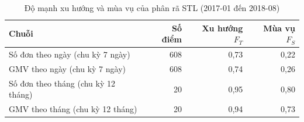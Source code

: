\begin{table}[htbp]\centering\scriptsize\caption{Độ mạnh xu hướng và mùa vụ của phân rã STL (2017-01 đến 2018-08)}\label{tab:stl}
\begin{tabular}{p{7.5cm}rrr}\toprule
\textbf{Chuỗi} & \textbf{Số điểm} & \textbf{Xu hướng $F_T$} & \textbf{Mùa vụ $F_S$}\\\midrule
Số đơn theo ngày (chu kỳ 7 ngày) & 608 & 0,73 & 0,22\\
GMV theo ngày (chu kỳ 7 ngày) & 608 & 0,74 & 0,26\\
Số đơn theo tháng (chu kỳ 12 tháng) & 20 & 0,95 & 0,80\\
GMV theo tháng (chu kỳ 12 tháng) & 20 & 0,94 & 0,73\\
\bottomrule\end{tabular}\end{table}
